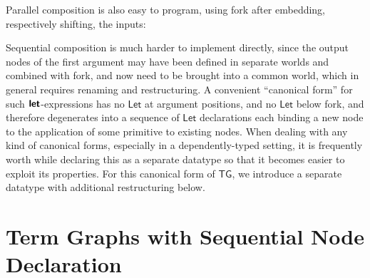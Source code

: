 \documentclass[copyright]{eptcs}
\makeatletter
\newcommand{\Conid}[1]{\mathit{#1}}
\newcommand{\Varid}[1]{\mathit{#1}}
\newcommand{\anonymous}{\kern0.06em \vbox{\hrule\@width.5em}}
\def\resethooks{\global\let\SaveRestoreHook\empty
  \global\let\ColumnHook\empty}
\let\hspost\empty
\renewcommand\Varid[1]{\mathord{\textsf{#1}}}
\let\Conid\Varid
\newcommand\Keyword[1]{\textsf{\textbf{#1}}}
\newcounter{x}
\newcounter{y}
\makeatother
\begin{document}
\noindent
Parallel composition is also easy to program,
using fork after embedding, respectively shifting, the inputs:

\resethooks



\noindent
Sequential composition is much harder to implement directly,
since the output nodes of the first argument
may have been defined in separate worlds and combined with fork,
and now need to be brought into a common world,
which in general requires renaming and restructuring.
A convenient ``canonical form'' for such \ensuremath{\Keyword{let}}-expressions
has no \ensuremath{\Conid{Let}} at argument positions,
and no \ensuremath{\Conid{Let}} below fork,
and therefore degenerates into a sequence of \ensuremath{\Conid{Let}} declarations
each binding a new node to the application of some primitive
to existing nodes.
When dealing with any kind of canonical forms,
especially in a dependently-typed setting,
it is frequently worth while declaring this as a separate datatype
so that it becomes easier to exploit its properties.
For this canonical form of \ensuremath{\Conid{TG}},
we introduce a separate datatype with additional restructuring below.


\section{Term Graphs with Sequential Node Declaration}
\end{document}
